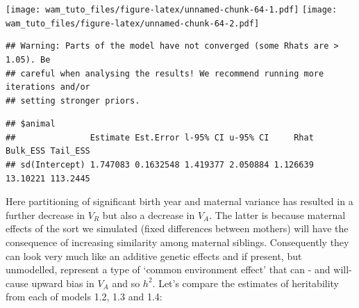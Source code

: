 \documentclass[
  12pt,
]{book}
\newenvironment{Shaded}{\begin{snugshade}}{\end{snugshade}}
\newcommand{\FloatTok}[1]{\textcolor[rgb]{0.00,0.00,0.81}{#1}}
\newcommand{\KeywordTok}[1]{\textcolor[rgb]{0.13,0.29,0.53}{\textbf{#1}}}
\newcommand{\NormalTok}[1]{#1}
\newcommand{\OperatorTok}[1]{\textcolor[rgb]{0.81,0.36,0.00}{\textbf{#1}}}
\begin{document}
\texttt{[image: wam\_tuto\_files/figure-latex/unnamed-chunk-64-1.pdf]} \texttt{[image: wam\_tuto\_files/figure-latex/unnamed-chunk-64-2.pdf]}

\begin{Shaded}
\end{Shaded}

\begin{verbatim}
## Warning: Parts of the model have not converged (some Rhats are > 1.05). Be
## careful when analysing the results! We recommend running more iterations and/or
## setting stronger priors.
\end{verbatim}

\begin{verbatim}
## $animal
##               Estimate Est.Error l-95% CI u-95% CI     Rhat Bulk_ESS Tail_ESS
## sd(Intercept) 1.747083 0.1632548 1.419377 2.050884 1.126639 13.10221 113.2445
\end{verbatim}

Here partitioning of significant birth year and maternal variance has resulted in a further decrease in \(V_R\) but also a decrease in \(V_A\). The latter is because maternal effects of the sort we simulated (fixed differences between mothers) will have the consequence of increasing similarity among maternal siblings. Consequently they can look very much like an additive genetic effects and if present, but unmodelled, represent a type of `common environment effect' that can - and will- cause upward bias in \(V_A\) and so \(h^2\). Let's compare the estimates of heritability from each of models 1.2, 1.3 and 1.4:
\end{document}
